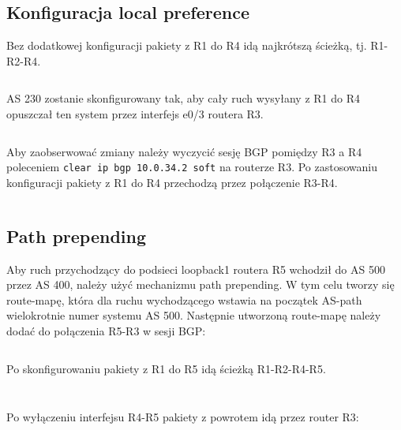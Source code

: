 \documentclass[a4paper,12pt,notitlepage]{article}
\begin{document}
\subsection{Konfiguracja local preference}

Bez dodatkowej konfiguracji pakiety z R1 do R4 idą najkrótszą ścieżką, tj. R1-R2-R4.

\inputminted[label=Komunikacja między R1 i R4 bez local preference, firstline=339, lastline=345]{text}{Routers/R1.txt}%

AS 230 zostanie skonfigurowany tak, aby cały ruch wysyłany z R1 do R4 opuszczał ten system przez interfejs e0/3 routera R3.

\inputminted[label=Ustawianie local preference na R3, firstline=931, lastline=935]{text}{Routers/R3.txt}%

Aby zaobserwować zmiany należy wyczycić sesję BGP pomiędzy R3 a R4 poleceniem \texttt{clear ip bgp 10.0.34.2 soft} na routerze R3. Po zastosowaniu konfiguracji pakiety z R1 do R4 przechodzą przez połączenie R3-R4.

\inputminted[label=Komunikacja między R1 i R4 z local preference, firstline=346, lastline=353]{text}{Routers/R1.txt}%

\subsection{Path prepending}

Aby ruch przychodzący do podsieci loopback1 routera R5 wchodził do AS 500 przez AS 400, należy użyć mechanizmu path prepending. W tym celu tworzy się route-mapę, która dla ruchu wychodzącego wstawia na początek AS-path wielokrotnie numer systemu AS 500. Następnie utworzoną route-mapę należy dodać do połączenia R5-R3 w sesji BGP:

\inputminted[label=Konfiguracja path prepending dla interfejsu R5-R3, firstline=372, lastline=378]{text}{Routers/R5_2.txt}%

Po skonfigurowaniu pakiety z R1 do R5 idą ścieżką R1-R2-R4-R5.

\inputminted[label=Komunikacja między R1 i R5 z path prepending, firstline=533, lastline=540]{text}{Routers/R1.txt}%

\inputminted[label=Baza danych BGP na R1, firstline=557, lastline=572]{text}{Routers/R1.txt}%

Po wyłączeniu interfejsu R4-R5 pakiety z powrotem idą przez router R3:

\inputminted[label=Komunikacja między R1 i R5 z path prepending, firstline=573, lastline=580]{text}{Routers/R1.txt}%
\end{document}

